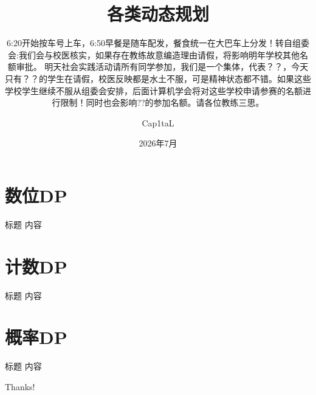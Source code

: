 ﻿\documentclass[aspectratio=169]{ctexbeamer}
\author{Cap1taL}
\title{各类动态规划}
\subtitle{6:20开始按车号上车，6:50早餐是随车配发，餐食统一在大巴车上分发！转自组委会:我们会与校医核实，如果存在教练故意编造理由请假，将影响明年学校其他名额审批。
明天社会实践活动请所有同学参加，我们是一个集体，代表？？，今天只有？？的学生在请假，校医反映都是水土不服，可是精神状态都不错。如果这些学校学生继续不服从组委会安排，后面计算机学会将对这些学校申请参赛的名额进行限制！同时也会影响??的参加名额。请各位教练三思。}
\date{2026年7月}
\begin{document}
\kaishu

\begin{frame}
    \titlepage
\end{frame}




\section{数位DP}

\begin{frame}{标题}
    内容
\end{frame}

\section{计数DP}

\begin{frame}{标题}
    内容
\end{frame}

\section{概率DP}

\begin{frame}{标题}
    内容
\end{frame}



\begin{frame}
    \begin{center}
        {\Huge\calligra Thanks!}
    \end{center}
\end{frame}
\end{document}
